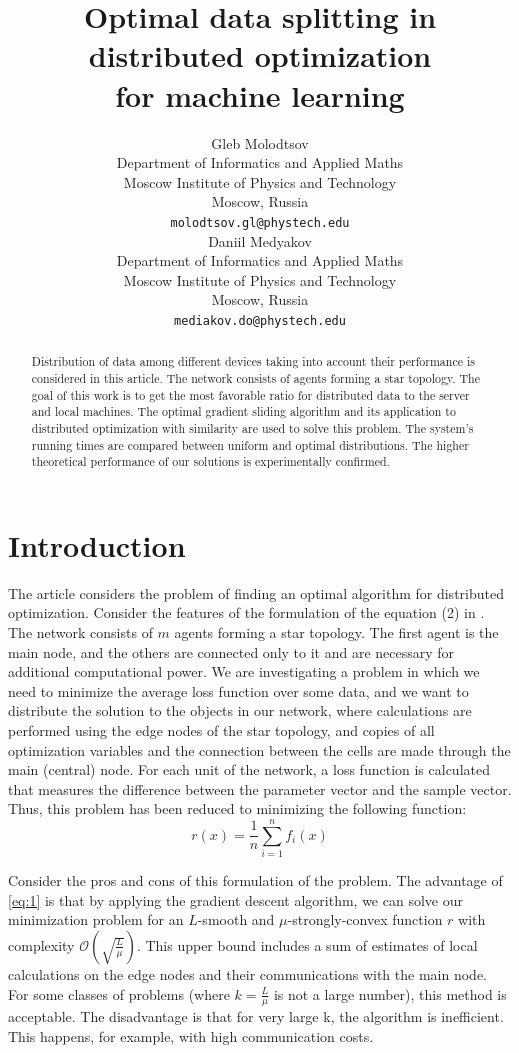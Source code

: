 \documentclass{article}
\title{Optimal data splitting in distributed optimization \\for machine learning}
\author{Gleb Molodtsov
    \\
	Department of Informatics and Applied Maths \\
	Moscow Institute of Physics and Technology\\
	Moscow, Russia\\
	\texttt{molodtsov.gl@phystech.edu} \\
	\And
	Daniil Medyakov \\
	Department of Informatics and Applied Maths \\
	Moscow Institute of Physics and Technology\\
	Moscow, Russia \\
	\texttt{mediakov.do@phystech.edu} \\
}
\date{}
\begin{document}
\maketitle

\begin{abstract}
Distribution of data among different devices taking into account their performance is considered in this article. The network consists of agents forming a star topology. The goal of this work is to get the most favorable ratio for distributed data to the server and local machines. The optimal gradient sliding algorithm and its application to distributed optimization with similarity are used to solve this problem. The system's running times are compared between uniform and optimal distributions. The higher theoretical performance of our solutions is experimentally confirmed. 
\end{abstract}




\section{Introduction}
The article \citep{kovalev2022optimal} considers the problem of finding an optimal algorithm for distributed optimization.
Consider the features of the formulation of the equation (2) in \citep{kovalev2022optimal}. The network consists of $m$ agents forming a star topology. The first agent is the main node, and the others are connected only to it and are necessary for additional computational power. We are investigating a problem in which we need to minimize the average loss function over some data, and we want to distribute the solution to the objects in our network, where calculations are performed using the edge nodes of the star topology, and copies of all optimization variables and the connection between the cells are made through the main (central) node. For each unit of the network, a loss function is calculated that measures the difference between the parameter vector and the sample vector. Thus, this problem has been reduced to minimizing the following function:
\\
\begin{equation}
    \label{eq:1}
    r(x) = \frac{1}{n} \sum \limits_{i = 1}^{n} f _i(x)
\end{equation}

Consider the pros and cons of this formulation of the problem.
The advantage of \ref{eq:1} is that by applying the gradient descent algorithm, we can solve our minimization problem for an $L$-smooth and $\mu$-strongly-convex function $r$ with complexity $\mathcal{O}(\sqrt{\frac{L}{\mu}})$. This upper bound includes a sum of estimates of local calculations on the edge nodes and their communications with the main node. For some classes of problems (where $k = \frac{L}{\mu}$ is not a large number), this method is acceptable. The disadvantage is that for very large k, the algorithm is inefficient. This happens, for example, with high communication costs.
\end{document}
